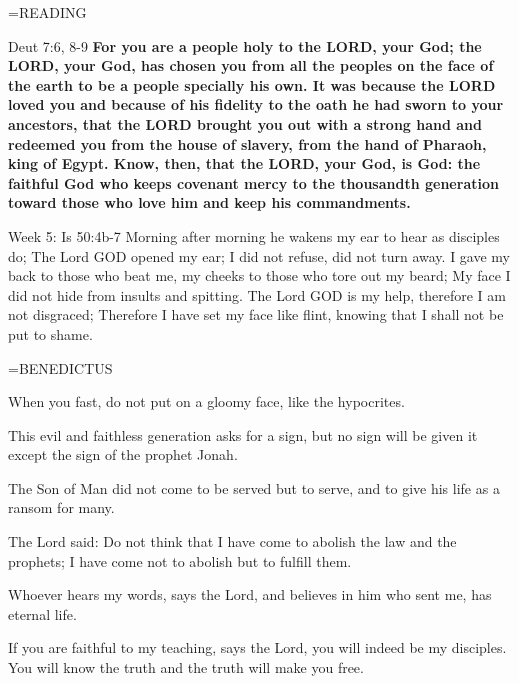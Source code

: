 \hangindent=\parindent \small READING
\begin{description}[labelindent=\parindent, leftmargin=*]
\item [Ash Wednesday \& Weeks 1-4:]     Deut 7:6, 8-9 \textbf{    For you are a people holy to the LORD, your God; the LORD, your God, has chosen you from all the peoples on the face of the earth to be a people specially his own. It was because the LORD loved you and because of his fidelity to the oath he had sworn to your ancestors, that the LORD brought you out with a strong hand and redeemed you from the house of slavery, from the hand of Pharaoh, king of Egypt. Know, then, that the LORD, your God, is God: the faithful God who keeps covenant mercy to the thousandth generation toward those who love him and keep his commandments.\\}
\end{description}

Week 5:    Is 50:4b-7    Morning after morning
he wakens my ear to hear as disciples do;
The Lord GOD opened my ear;
I did not refuse,
did not turn away.
I gave my back to those who beat me,
my cheeks to those who tore out my beard;
My face I did not hide
from insults and spitting.
The Lord GOD is my help,
therefore I am not disgraced;
Therefore I have set my face like flint,
knowing that I shall not be put to shame.

\hangindent=\parindent \small BENEDICTUS
\begin{description}[labelindent=\parindent, leftmargin=*]
\item [Ash Wednesday:] 	When you fast, do not put on a gloomy face, like the hypocrites.
\item [Week 1:] 	This evil and faithless generation asks for a sign, but no sign will be given it except the sign of the prophet Jonah.
\item [Week 2:] 	The Son of Man did not come to be served but to serve, and to give his life as a ransom for many.
\item [Week 3:] 	The Lord said: Do not think that I have come to abolish the law and the prophets; I have come not to abolish but to fulfill them.
\item [Week 4:] 	Whoever hears my words, says the Lord, and believes in him who sent me, has eternal life.
\item [Week 5:] 	If you are faithful to my teaching, says the Lord, you will indeed be my disciples. You will know the truth and the truth will make you free.
\end{description}

